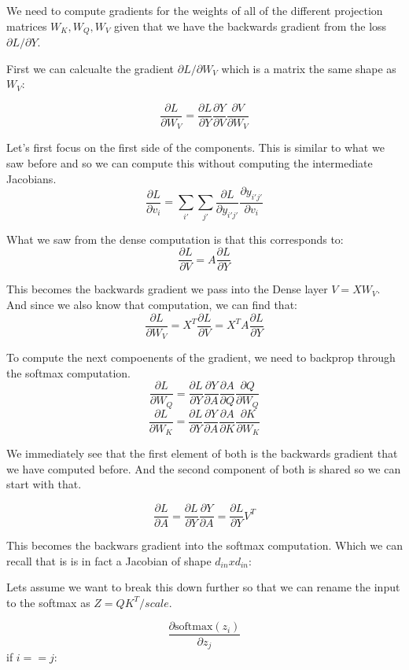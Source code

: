 \documentclass{article}
\begin{document}
We need to compute gradients for the weights of all of the different
projection matrices $ W_K, W_Q, W_V$ given that we have the backwards
gradient from the loss $\partial L / \partial Y$.

First we can calcualte the gradient $\partial L / \partial W_V$ which is
a matrix the same shape as $W_V$:

$$
\frac{\partial L}{\partial W_V} = \frac{\partial L}{\partial Y}\frac{
    \partial Y}{\partial V}\frac{\partial V}{\partial W_V}
$$

Let's first focus on the first side of the components. This is similar to 
what we saw before and so we can compute this without computing the
intermediate Jacobians.
$$
\frac{\partial L}{\partial v_i} = \sum_{i'}\sum_{j'}\frac{
    \partial L}{\partial y_{i'j'}}\frac{
        \partial y_{i'j'}}{\partial v_i}
$$

What we saw from the dense computation is that this corresponds to:
$$
\frac{\partial L}{\partial V} = A\frac{\partial L}{\partial Y}
$$

This becomes the backwards gradient we pass into the Dense layer $V = XW_V$.
And since we also know that computation, we can find that:
$$
\frac{\partial L}{\partial W_V} = X^T\frac{\partial L}{\partial V} =
X^TA\frac{\partial L}{\partial Y}
$$

To compute the next compoenents of the gradient, we need to backprop through
the softmax computation.
$$
\frac{\partial L}{\partial W_Q} = \frac{\partial L}{\partial Y}
\frac{\partial Y}{\partial A}\frac{\partial A}{\partial Q}
\frac{\partial Q}{\partial W_Q}
$$
$$
\frac{\partial L}{\partial W_K} = \frac{\partial L}{\partial Y}
\frac{\partial Y}{\partial A}\frac{\partial A}{\partial K}
\frac{\partial K}{\partial W_K}
$$

We immediately see that the first element of both is the backwards gradient
that we have computed before. And the second component of both is shared so
we can start with that.

$$
\frac{\partial L}{\partial A} = \frac{\partial L}{\partial Y}
\frac{\partial Y}{\partial A} = \frac{\partial L}{\partial Y}V^T
$$

This becomes the backwars gradient into the softmax computation. Which we
can recall that is is in fact a Jacobian of shape $d_{in} x d_{in}$:

Lets assume we want to break this down further so that we can rename the
input to the softmax as $Z = QK^T / scale$.

$$
\frac{\partial \text{softmax}(z_i)}{\partial z_j}
$$
if $i == j$:
\end{document}
